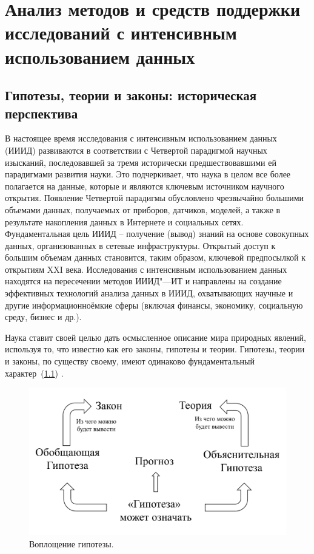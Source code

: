 \chapter{Анализ методов и средств поддержки исследований с интенсивным использованием данных} \label{chapt1}

\section{Гипотезы, теории и законы: историческая перспектива} \label{sect1_1}

В настоящее время исследования с интенсивным использованием данных (ИИИД) развиваются в соответствии с Четвертой 
парадигмой \cite{Hey2009} научных изысканий, последовавшей за тремя исторически предшествовавшими ей парадигмами 
развития науки. Это подчеркивает, что наука в целом все более полагается на данные, которые и являются ключевым 
источником научного открытия. Появление Четвертой парадигмы обусловлено чрезвычайно большими объемами данных, 
получаемых от приборов, датчиков, моделей, а также в результате накопления данных в Интернете и социальных сетях. 
Фундаментальная цель ИИИД – получение (вывод) знаний на основе совокупных данных, организованных в сетевые 
инфраструктуры. Открытый доступ к большим объемам данных становится, таким образом, ключевой предпосылкой к открытиям 
XXI века. Исследования с интенсивным использованием данных находятся на пересечении методов ИИИД"---ИТ и направлены 
на создание эффективных технологий анализа данных в ИИИД, охватывающих научные и другие информационноёмкие сферы 
(включая финансы, экономику, социальную среду, бизнес и др.).


Наука ставит своей целью дать осмысленное описание мира природных явлений, используя то, что известно как его законы, 
гипотезы и теории. Гипотезы, теории и законы, по существу своему, имеют одинаково фундаментальный 
характер~(\cref{fig:hypothesis_repr}) \cite{McComas2005}. 

\begin{figure}[ht]
    \centering
    \includegraphics[width=0.7\linewidth]{images/hypothesis_life.pdf}
    \caption{Воплощение гипотезы.}\label{fig:hypothesis_repr}
\end{figure}

